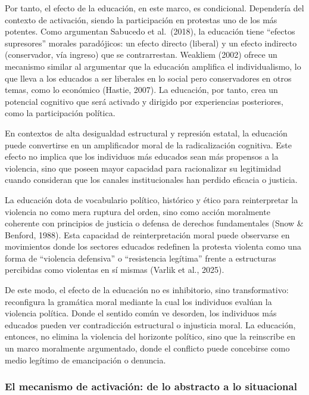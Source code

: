 \documentclass[
  13pt,
]{article}
\begin{document}
Por tanto, el efecto de la educación, en este marco, es condicional.
Dependería del contexto de activación, siendo la participación en
protestas uno de los más potentes. Como argumentan Sabucedo et
al.~(2018), la educación tiene ``efectos supresores'' morales
paradójicos: un efecto directo (liberal) y un efecto indirecto
(conservador, vía ingreso) que se contrarrestan. Weakliem (2002) ofrece
un mecanismo similar al argumentar que la educación amplifica el
individualismo, lo que lleva a los educados a ser liberales en lo social
pero conservadores en otros temas, como lo económico (Hastie, 2007). La
educación, por tanto, crea un potencial cognitivo que será activado y
dirigido por experiencias posteriores, como la participación política.

En contextos de alta desigualdad estructural y represión estatal, la
educación puede convertirse en un amplificador moral de la
radicalización cognitiva. Este efecto no implica que los individuos más
educados sean más propensos a la violencia, sino que poseen mayor
capacidad para racionalizar su legitimidad cuando consideran que los
canales institucionales han perdido eficacia o justicia.

La educación dota de vocabulario político, histórico y ético para
reinterpretar la violencia no como mera ruptura del orden, sino como
acción moralmente coherente con principios de justicia o defensa de
derechos fundamentales (Snow \& Benford, 1988). Esta capacidad de
reinterpretación moral puede observarse en movimientos donde los
sectores educados redefinen la protesta violenta como una forma de
``violencia defensiva'' o ``resistencia legítima'' frente a estructuras
percibidas como violentas en sí mismas (Varlik et al., 2025).

De este modo, el efecto de la educación no es inhibitorio, sino
transformativo: reconfigura la gramática moral mediante la cual los
individuos evalúan la violencia política. Donde el sentido común ve
desorden, los individuos más educados pueden ver contradicción
estructural o injusticia moral. La educación, entonces, no elimina la
violencia del horizonte político, sino que la reinscribe en un marco
moralmente argumentado, donde el conflicto puede concebirse como medio
legítimo de emancipación o denuncia.

\subsubsection{El mecanismo de activación: de lo abstracto a lo
situacional}\label{el-mecanismo-de-activaciuxf3n-de-lo-abstracto-a-lo-situacional}
\end{document}
